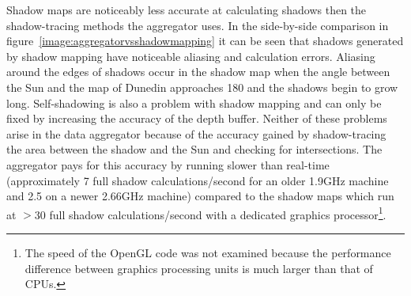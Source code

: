 \documentclass[12pt]{report}
\newcommand{\note}[1]{}
\newcommand{\notedme}[1]{}
\begin{document}
Shadow maps are noticeably less accurate at calculating shadows then the shadow-tracing methods the aggregator uses. In the side-by-side comparison in figure~\ref{image:aggregatorvsshadowmapping} it can be seen that shadows generated by shadow mapping have noticeable aliasing and calculation errors. Aliasing around the edges of shadows occur in the shadow map when the angle between the Sun and the map of Dunedin approaches 180{\degree} and the shadows begin to grow long. Self-shadowing is also a problem with shadow mapping and can only be fixed by increasing the accuracy of the depth buffer. Neither of these problems arise in the data aggregator because of the accuracy gained by shadow-tracing the area between the shadow and the Sun and checking for intersections. The aggregator pays for this accuracy by running slower than real-time (approximately 7 full shadow calculations/second for an older 1.9GHz machine and 2.5 on a newer 2.66GHz machine) compared to the shadow maps which run at $>$30 full shadow calculations/second with a dedicated graphics processor\footnote{The speed of the OpenGL code was not examined because the performance difference between graphics processing units is much larger than that of CPUs.}.\note{I'm not going to make accurate estimations about how fast the viewer runs because the speed difference between different graphics processing units is quite large}

\note{why would frame skipping be performed? The time is updated every frame not the other way round, by real-time I mean the program updates more than 24 times per second}\notedme{Where does 24 come from?? Heh heh - I should really have asked earlier about your take on time, as I think there's something I don't understand about it (although it's obviously not much of a problem!). One fundamental point is that if you can generate a graphics frame in less time than it takes to display it, then you probably don't need to optimise your code further for interactive use. I'd expect most monitors these days update at rates between 60Hz and 120Hz. I wouldn't see a need to link simulation time with wall-clock time, as presumably this is not going to be informative for interactive use (a nice screen saver idea, though). In the above discussion of ``real-time'', though, assuming that you wanted to link simulation-time with wall-clock time, surely you would just set simulation-time to step in the same way wall-clock time does with every frame (i.e. 7s on the old machine). Hmm, OK, I think I've talked myself around to seeing what you are saying. I think you mean slower than ``convenient for interaction'' rather than ``real-time'' I think - so 24fps is your estimate of the eye's perception of frame update speed?}\note{yes. I've added a footnote in the introduction to make this distinction.}
\end{document}
